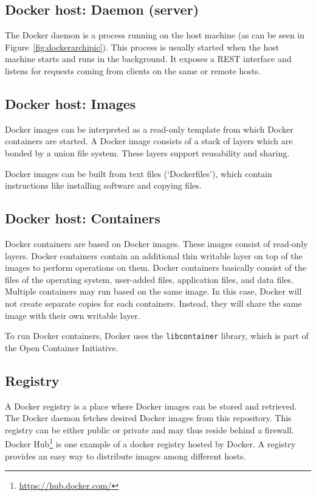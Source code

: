 \subsection{Docker host: Daemon (server)}
The Docker daemon is a process running on the host machine (as can be seen in Figure~\ref{fig:dockerarchipic}). This process is usually started when the host machine starts and runs in the background. It exposes a REST interface and listens for requests coming from clients on the same or remote hosts.

\subsection{Docker host: Images}
Docker images can be interpreted as a read-only template from which Docker containers are
started. A Docker image consists of a stack of layers which are bonded by a union file system. These layers support reusability and sharing.

Docker images can be built from text files (`Dockerfiles'), which contain instructions like installing software and copying files.

\subsection{Docker host: Containers}
Docker containers are based on Docker images. These images consist of read-only
layers. Docker containers contain an additional thin writable layer on top of the images to
perform operations on them. Docker containers basically consist of the files of the operating system,
user-added files, application files, and data files. Multiple containers may run
based on the same image. In this case, Docker will not create separate copies for
each containers. Instead, they will share the same image with their own writable layer.

To run Docker containers, Docker uses the \verb|libcontainer| library, which is part of the Open Container Initiative.

\subsection{Registry}
\label{subsec:dockerregistry}
A Docker registry is a place where Docker images can be stored and retrieved. The Docker daemon
fetches desired Docker images from this repository. This registry can be either public or private and may thus reside behind a firewall. Docker
Hub\footnote{\url{https://hub.docker.com/}} is one example of a docker registry
hosted by Docker. A registry provides an easy way to distribute images among different hosts.

